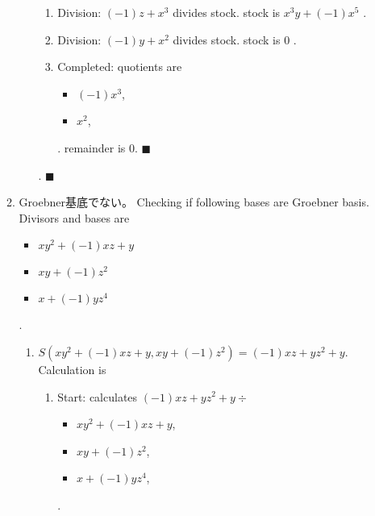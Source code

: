 \begin{enumerate}[label=(問題 \arabic*)]
\begin{enumerate}[label=(\alph*)]
\begin{enumerate}
\begin{enumerate}
      \item Division: $(-1)z+x^{3}$ divides stock. stock is $x^{3}y+(-1)x^{5}$ .
      \item Division: $(-1)y+x^{2}$ divides stock. stock is $0$ .
      \item Completed: quotients are \begin{itemize}
      \item $(-1)x^{3}$,
      \item $x^{2}$,
      \end{itemize} .
      remainder is $0$.  $\blacksquare$
      \end{enumerate}
      .  $\blacksquare{}$\end{enumerate}
    \item
    Groebner基底でない。
    Checking if following bases are Groebner basis.
      Divisors and bases are
      \begin{itemize}
      \item $xy^{2}+(-1)xz+y$\item $xy+(-1)z^{2}$\item $x+(-1)yz^{4}$\end{itemize} .
      \begin{enumerate}
      \item $S(xy^{2}+(-1)xz+y, xy+(-1)z^{2}) = (-1)xz+yz^{2}+y$.  Calculation is \begin{enumerate}
      \item Start: calculates $(-1)xz+yz^{2}+y\div $\begin{itemize}
      \item $xy^{2}+(-1)xz+y$,
      \item $xy+(-1)z^{2}$,
      \item $x+(-1)yz^{4}$,
      \end{itemize} .


\end{enumerate}
\end{enumerate}
\end{enumerate}
\end{enumerate}
